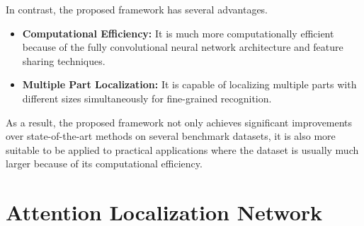 \documentclass[10pt,twocolumn,letterpaper]{article}
\begin{document}
In contrast, the proposed framework has several advantages.
\begin{itemize}
\item {\bf Computational Efficiency:} It is much more computationally efficient because of the fully convolutional neural network architecture and feature sharing techniques.
\item {\bf Multiple Part Localization:} It is capable of localizing multiple parts with different sizes simultaneously for fine-grained recognition.
\end{itemize}

As a result, the proposed framework not only achieves significant improvements over state-of-the-art methods on several benchmark datasets,
it is also more suitable to be applied to practical applications where the dataset is usually much larger because of its computational efficiency.





\section{Attention Localization Network}
\end{document}
